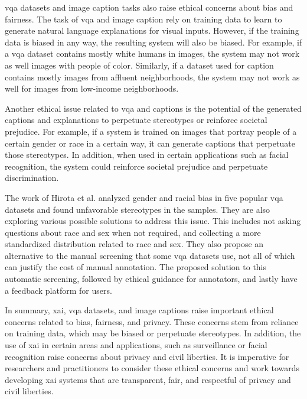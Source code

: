 \begin{comment}
Another ethical issue with \gls{xai} is the possibility that the system will be used for surveillance or other privacy-intrusive purposes. For example, an \gls{xai} system used to monitor people in public spaces could raise concerns about civil liberties and privacy rights. In addition, \gls{xai} systems capable of understanding and interpreting visual or textual information could also be used to profile individuals based on their race, gender, age, or other personal characteristics.
\end{comment}


\gls{vqa} datasets and image caption tasks also raise ethical concerns about bias and fairness. The task of \gls{vqa} and image caption rely on training data to learn to generate natural language explanations for visual inputs. However, if the training data is biased in any way, the resulting system will also be biased. For example, if a \gls{vqa} dataset contains mostly white humans in images, the system may not work as well images with people of color. Similarly, if a dataset used for caption contains mostly images from affluent neighborhoods, the system may not work as well for images from low-income neighborhoods. 

Another ethical issue related to \gls{vqa} and captions is the potential of the generated captions and explanations to perpetuate stereotypes or reinforce societal prejudice. For example, if a system is trained on images that portray people of a certain gender or race in a certain way, it can generate captions that perpetuate those stereotypes. In addition, when used in certain applications such as facial recognition, the system could reinforce societal prejudice and perpetuate discrimination.

The work of Hirota et al.\cite{hirotaGenderRacialBias2022} analyzed gender and racial bias in five popular \gls{vqa} datasets and found unfavorable stereotypes in the samples. They are also exploring various possible solutions to address this issue. This includes not asking questions about race and sex when not required, and collecting a more standardized distribution related to race and sex. They also propose an alternative to the manual screening that some \gls{vqa} datasets use, not all of which can justify the cost of manual annotation. The proposed solution to this automatic screening, followed by ethical guidance for annotators, and lastly have a feedback platform for users. 


In summary, \gls{xai}, \gls{vqa} datasets, and image captions raise important ethical concerns related to bias, fairness, and privacy. These concerns stem from reliance on training data, which may be biased or perpetuate stereotypes. In addition, the use of \gls{xai} in certain areas and applications, such as surveillance or facial recognition raise concerns about privacy and civil liberties. It is imperative for researchers and practitioners to consider these ethical concerns and work towards developing \gls{xai} systems that are transparent, fair, and respectful of privacy and civil liberties.